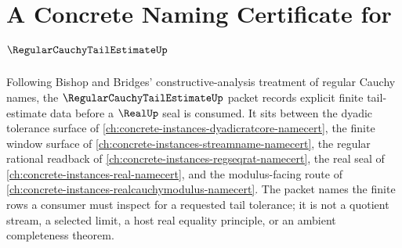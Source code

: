 \chapter{A Concrete Naming Certificate for $\RegularCauchyTailEstimateUp$}
\label{ch:concrete-instances-regularcauchytailestimate-namecert}

Following Bishop and Bridges' constructive-analysis treatment of regular
Cauchy names, the $\RegularCauchyTailEstimateUp$ packet records explicit
finite tail-estimate data before a $\RealUp$ seal is consumed. It sits between
the dyadic tolerance surface of \autoref{ch:concrete-instances-dyadicratcore-namecert},
the finite window surface of \autoref{ch:concrete-instances-streamname-namecert},
the regular rational readback of \autoref{ch:concrete-instances-regseqrat-namecert},
the real seal of \autoref{ch:concrete-instances-real-namecert}, and the
modulus-facing route of \autoref{ch:concrete-instances-realcauchymodulus-namecert}.
The packet names the finite rows a consumer must inspect for a requested tail
tolerance; it is not a quotient stream, a selected limit, a host real equality
principle, or an ambient completeness theorem.

